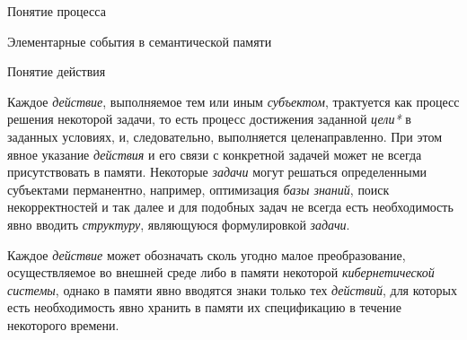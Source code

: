 \begin{frame}{\large Понятие процесса}
\begin{frame}{\large Элементарные события в семантической памяти}
\begin{frame}{Понятие действия}
 \begin{SCn}
	\begin{scnindent}
	\end{scnindent}
\end{SCn}
\end{frame}
\begin{frame}{}
    \begin{SCn}
\end{SCn}
\end{frame}

\begin{frame}{}
\justifying
Каждое \textit{действие}, выполняемое тем или иным \textit{субъектом}, трактуется как процесс решения некоторой задачи, то есть процесс достижения заданной \textit{цели*} в заданных условиях, и, следовательно, выполняется целенаправленно. При этом явное указание \textit{действия} и его связи с конкретной задачей может не всегда присутствовать в памяти. Некоторые \textit{задачи} могут решаться определенными субъектами перманентно, например, оптимизация \textit{базы знаний}, поиск некорректностей и так далее и для подобных задач не всегда есть необходимость явно вводить \textit{структуру}, являющуюся формулировкой \textit{задачи}.

Каждое \textit{действие} может обозначать сколь угодно малое преобразование, осуществляемое во внешней среде либо в памяти некоторой \textit{кибернетической системы}, однако в памяти явно вводятся знаки только тех \textit{действий}, для которых есть необходимость явно хранить в памяти их спецификацию в течение некоторого времени.
\end{frame}


\end{frame}
\end{frame}

